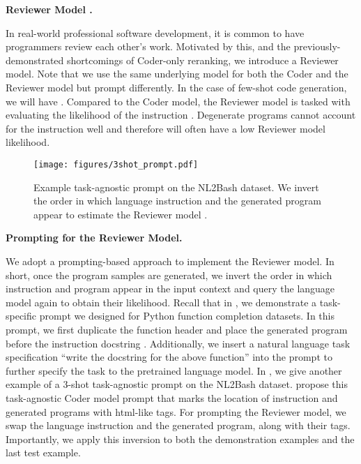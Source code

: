 \documentclass[nohyperref]{article}
\theoremstyle{plain}
\theoremstyle{definition}
\theoremstyle{remark}
\renewcommand{\paragraph}[1]{
     \textbf{#1} 
 }
\begin{document}
\paragraph{Reviewer Model .}
In real-world professional software development, it is common to have programmers review each other's work.    
Motivated by this, and the previously-demonstrated shortcomings of Coder-only reranking, we introduce a Reviewer model.
Note that we use the same underlying model  for both the Coder and the Reviewer model but prompt differently.
In the case of few-shot code generation, we will have .
Compared to the Coder model, the Reviewer model is tasked with evaluating the likelihood of the instruction .
Degenerate programs cannot account for the instruction well and therefore will often have a low Reviewer model likelihood.

\begin{figure}[t]
     \centering
     \texttt{[image: figures/3shot\_prompt.pdf]}
     \caption{Example task-agnostic prompt on the NL2Bash dataset. We invert the order in which language instruction and the generated program appear to estimate the Reviewer model .}
     \label{fig:prompt_example}
     \vspace{-15pt}
\end{figure}

\paragraph{Prompting for the Reviewer Model.}
We adopt a prompting-based approach to implement the Reviewer model.
In short, once the program samples  are generated, we invert the order in which instruction  and program  appear in the input context and query the language model  again to obtain their likelihood.
Recall that in , we demonstrate a task-specific prompt we designed for Python function completion datasets.
In this prompt, we first duplicate the function header and place the generated program  before the instruction docstring .
Additionally, we insert a natural language task specification ``write the docstring for the above function'' into the prompt to further specify the task to the pretrained language model.
In , we give another example of a 3-shot task-agnostic prompt on the NL2Bash dataset.
\citet{mbr} propose this task-agnostic Coder model prompt that marks the location of instruction and generated programs with html-like tags.
For prompting the Reviewer model, we swap the language instruction and the generated program, along with their tags.
Importantly, we apply this inversion to both the demonstration examples and the last test example.
\end{document}
